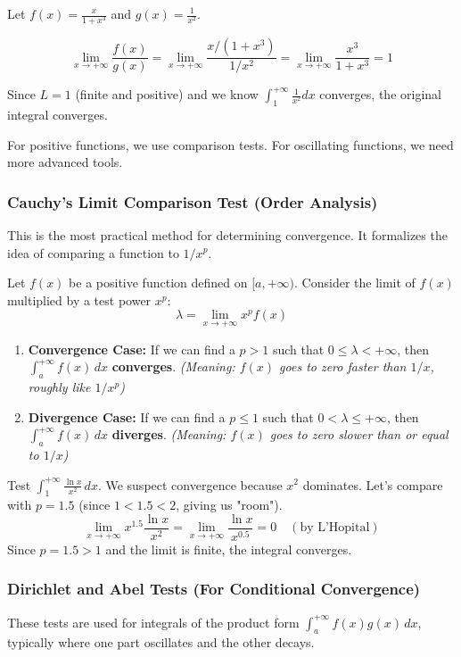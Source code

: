 Let $f(x) = \frac{x}{1+x^3}$ and $g(x) = \frac{1}{x^2}$.

\[
\lim_{x \to +\infty} \frac{f(x)}{g(x)} = \lim_{x \to +\infty} \frac{x/(1+x^3)}{1/x^2} = \lim_{x \to +\infty} \frac{x^3}{1+x^3} = 1
\]

Since $L=1$ (finite and positive) and we know $\int_1^{+\infty} \frac{1}{x^2} dx$ converges, the original integral converges.



For positive functions, we use comparison tests. For oscillating functions, we need more advanced tools.

\subsubsection{Cauchy's Limit Comparison Test (Order Analysis)}
This is the most practical method for determining convergence. It formalizes the idea of comparing a function to $1/x^p$.

\begin{theorem}
Let $f(x)$ be a positive function defined on $[a, +\infty)$. Consider the limit of $f(x)$ multiplied by a test power $x^p$:
\[
\lambda = \lim_{x \to +\infty} x^p f(x)
\]
\begin{enumerate}
    \item \textbf{Convergence Case:} If we can find a $p > 1$ such that $0 \le \lambda < +\infty$, then $\int_a^{+\infty} f(x) \, dx$ \textbf{converges}.
    \textit{(Meaning: $f(x)$ goes to zero faster than $1/x$, roughly like $1/x^p$)}
    
    \item \textbf{Divergence Case:} If we can find a $p \le 1$ such that $0 < \lambda \le +\infty$, then $\int_a^{+\infty} f(x) \, dx$ \textbf{diverges}.
    \textit{(Meaning: $f(x)$ goes to zero slower than or equal to $1/x$)}
\end{enumerate}
\end{theorem}

\begin{example}
Test $\int_1^{+\infty} \frac{\ln x}{x^2} \, dx$.
We suspect convergence because $x^2$ dominates. Let's compare with $p=1.5$ (since $1 < 1.5 < 2$, giving us "room").
\[
\lim_{x \to +\infty} x^{1.5} \frac{\ln x}{x^2} = \lim_{x \to +\infty} \frac{\ln x}{x^{0.5}} = 0 \quad (\text{by L'Hopital})
\]
Since $p=1.5 > 1$ and the limit is finite, the integral converges.
\end{example}

\subsubsection{Dirichlet and Abel Tests (For Conditional Convergence)}
These tests are used for integrals of the product form $\int_a^{+\infty} f(x)g(x) \, dx$, typically where one part oscillates and the other decays.


